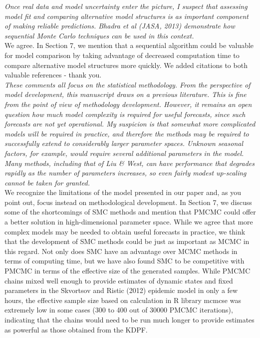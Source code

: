 \documentclass{article}
\begin{document}
\noindent \emph{Once real data and model uncertainty enter the picture, I suspect that assessing model fit and comparing alternative model structures is as important component of making reliable predictions. Bhadra et al (JASA, 2013) demonstrate how sequential Monte Carlo techniques can be used in this context.} \\

We agree. In Section 7, we mention that a sequential algorithm could be valuable for model comparison by taking advantage of decreased computation time to compare alternative model structures more quickly. We added citations to both valuable references - thank you. \\

\noindent \emph{These comments all focus on the statistical methodology. From the perspective of model development, this manuscript draws on a previous literature. This is fine from the point of view of methodology development. However, it remains an open question how much model complexity is required for useful forecasts, since such forecasts are not yet operational. My suspicion is that somewhat more complicated models will be required in practice, and therefore the methods may be required to successfully extend to considerably larger parameter spaces. Unknown seasonal factors, for example, would require several additional parameters in the model. Many methods, including that of Liu \& West, can have performance that degrades rapidly as the number of parameters increases, so even fairly modest up-scaling cannot be taken for granted.} \\

We recognize the limitations of the model presented in our paper and, as you point out, focus instead on methodological development. In Section 7, we discuss some of the shortcomings of SMC methods and mention that PMCMC could offer a better solution in high-dimensional parameter space.  While we agree that more complex models may be needed to obtain useful forecasts in practice, we think that the development of SMC methods could be just as important as MCMC in this regard. Not only does SMC have an advantage over MCMC methods in terms of computing time, but we have also found SMC to be competitive with PMCMC in terms of the effective size of the generated samples. While PMCMC chains mixed well enough to provide estimates of dynamic states and fixed parameters in the Skvortsov and Ristic (2012) epidemic model in only a few hours, the effective sample size based on calculation in R library mcmcse was extremely low in some cases (300 to 400 out of 30000 PMCMC iterations), indicating that the chains would need to be run much longer to provide estimates as powerful as those obtained from the KDPF. \\
\end{document}
